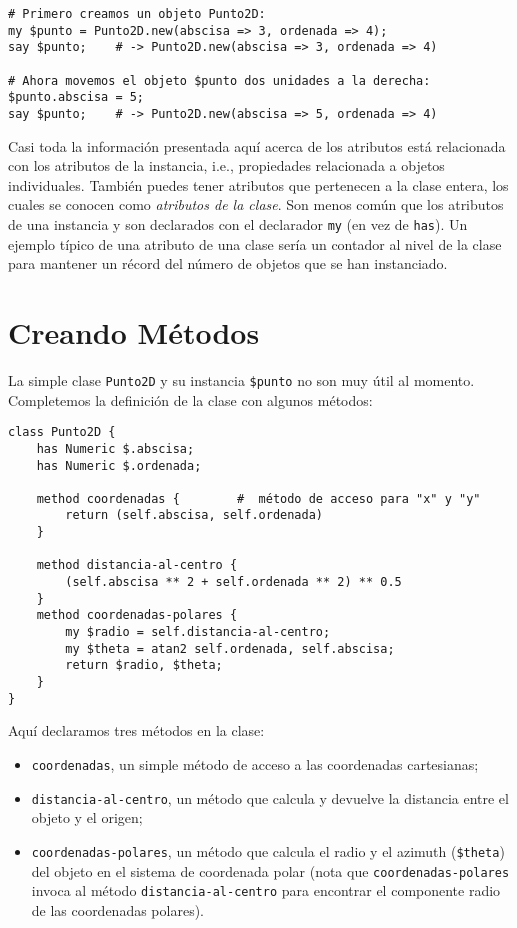 \begin{verbatim}
# Primero creamos un objeto Punto2D:
my $punto = Punto2D.new(abscisa => 3, ordenada => 4);
say $punto;    # -> Punto2D.new(abscisa => 3, ordenada => 4)

# Ahora movemos el objeto $punto dos unidades a la derecha:
$punto.abscisa = 5; 
say $punto;    # -> Punto2D.new(abscisa => 5, ordenada => 4)
\end{verbatim}


Casi toda la información presentada aquí acerca de los atributos
está relacionada con los atributos de la instancia, i.e., propiedades
relacionada a objetos individuales. También puedes tener atributos que
pertenecen a la clase entera, los cuales se conocen como \emph{atributos de la
clase}. Son menos común que los atributos de una instancia y son declarados
con el declarador {\tt my} (en vez de {\tt has}). Un ejemplo típico de
una atributo de una clase sería un contador al nivel de la clase para
mantener un récord del número de objetos que se han instanciado.


\section{Creando Métodos}

La simple clase {\tt Punto2D} y su instancia \verb|$punto|
no son muy útil al momento. Completemos la definición de la
clase con algunos métodos:

\begin{verbatim}
class Punto2D {
    has Numeric $.abscisa;
    has Numeric $.ordenada;
    
    method coordenadas {        #  método de acceso para "x" y "y"
        return (self.abscisa, self.ordenada)
    }
    
    method distancia-al-centro {
        (self.abscisa ** 2 + self.ordenada ** 2) ** 0.5
    }
    method coordenadas-polares {
        my $radio = self.distancia-al-centro;
        my $theta = atan2 self.ordenada, self.abscisa;
        return $radio, $theta;
    }
}
\end{verbatim}

Aquí declaramos tres métodos en la clase:
\begin{itemize}
\item {\tt coordenadas}, un simple método de acceso a
las coordenadas cartesianas;

\item{\tt distancia-al-centro}, un método que calcula y devuelve
la distancia entre el objeto y el origen;

\item{\tt coordenadas-polares}, un método que calcula el radio y 
el azimuth (\verb|$theta|) del objeto en el sistema de coordenada
polar (nota que {\tt coordenadas-polares} invoca al método 
{\tt distancia-al-centro} para encontrar el componente radio de las 
coordenadas polares).
\end{itemize}

